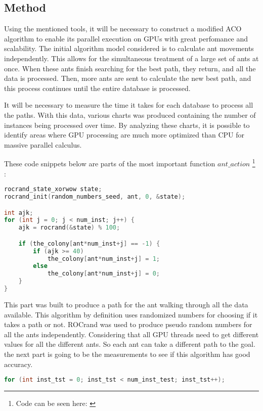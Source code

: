 \subsection{Method} \label{Method}

Using the mentioned tools, it will be necessary to construct a modified ACO algorithm to enable its parallel execution on GPUs with great perfomance and scalability. The initial algorithm model considered is to calculate ant movements independently. This allows for the simultaneous treatment of a large set of ants at once. When these ants finish searching for the best path, they return, and all the data is processed. Then, more ants are sent to calculate the new best path, and this process continues until the entire database is processed.

It will be necessary to measure the time it takes for each database to process all the paths. With this data, various charts was produced containing the number of instances being processed over time. By analyzing these charts, it is possible to identify areas where GPU processing are much more optimized than CPU for massive parallel calculus.

These code snippets below are parts of the most important function $ant\_action$ \footnote{Code can be seen here: \cite{santiago_parallel_aco}} :


\begin{lstlisting}[language=c++]
rocrand_state_xorwow state;
rocrand_init(random_numbers_seed, ant, 0, &state);

int ajk;
for (int j = 0; j < num_inst; j++) {
    ajk = rocrand(&state) % 100;

    if (the_colony[ant*num_inst+j] == -1) {
        if (ajk >= 40)
            the_colony[ant*num_inst+j] = 1;
        else
            the_colony[ant*num_inst+j] = 0;
    }
}
\end{lstlisting}

This part was built to produce a path for the ant walking through all the data available.
This algorithm by definition uses randomized numbers for choosing if it takes a path or not.
ROCrand \cite{rocrand} was used to produce pseudo random numbers for all the ants independently.
Considering that all GPU threads need to get different values for all the different ants. So each ant
can take a different path to the goal. the next part is going to be the measurements to see if
this algorithm has good accuracy.

\begin{lstlisting}[language=c++]
for (int inst_tst = 0; inst_tst < num_inst_test; inst_tst++);
\end{lstlisting}

